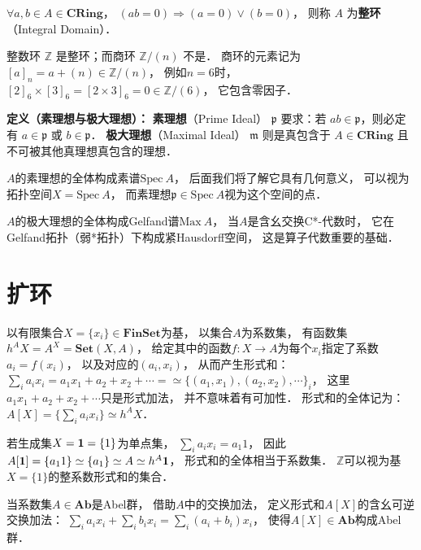 \begin{framed}
\noindent
$\forall a,b \in A \in \textbf{CRing}$，
$(ab=0) \Rightarrow (a=0) \vee (b=0)$，
则称 $A$ 为\textbf{整环}（Integral Domain）．
\end{framed}

整数环 $\mathbb{Z}$ 是整环；而商环 $\mathbb{Z}/(n)$ 不是．
商环的元素记为$[a]_n = a + (n) \in \mathbb{Z}/(n)$，
例如$n=6$时，
$[2]_6 \times [3]_6 = [2 \times 3]_6 = 0 \in \mathbb{Z}/(6)$，
它包含零因子．

\begin{framed}
\noindent\textbf{定义（素理想与极大理想）：}
\textbf{素理想}（Prime Ideal） $\mathfrak{p}$ 要求：若 $ab \in \mathfrak{p}$，则必定有 $a \in \mathfrak{p}$ 或 $b \in \mathfrak{p}$．
\textbf{极大理想}（Maximal Ideal） $\mathfrak{m}$ 则是真包含于 $A \in \textbf{CRing}$ 且不可被其他真理想真包含的理想．
\end{framed}

$A$的素理想的全体构成素谱$\text{Spec} \ A$，
后面我们将了解它具有几何意义，
可以视为拓扑空间$X = \text{Spec} \ A$，
而素理想$\mathfrak p\in \text{Spec} \ A$视为这个空间的点．

$A$的极大理想的全体构成Gelfand谱$\text{Max} \ A$，
当$A$是含幺交换C*-代数时，
它在Gelfand拓扑（弱*拓扑）下构成紧Hausdorff空间，
这是算子代数重要的基础．

\section{扩环}

以有限集合$X = \{x_i\} \in\textbf{FinSet}$为基，
以集合$A$为系数集，
有函数集$h^A X = A^X = \textbf{Set}(X,A)$，
给定其中的函数$f:X \to A$为每个$x_i$指定了系数$a_i = f(x_i)$，
以及对应的$(a_i,x_i)$，
从而产生形式和：
$\sum_i a_i x_i = a_1 x_1 + a_2 + x_2 + \cdots = \simeq \{ (a_1,x_1),(a_2,x_2), \cdots \}_i$，
这里$a_1 x_1 + a_2 + x_2 + \cdots$只是形式加法，
并不意味着有可加性．
形式和的全体记为：
$A[X] = \{ \sum_i a_i x_i \} \simeq h^A X$．

若生成集$X = \textbf 1 = \{1\}$为单点集，
$\sum_i a_i x_i = a_1 1$，
因此
$A[\textbf{1}] = \{ a_1 1 \} \simeq \{ a_1 \} \simeq A \simeq h^A \textbf 1$，
形式和的全体相当于系数集．
$\mathbb Z$可以视为基$X=\{1\}$的整系数形式和的集合．

当系数集$A \in \textbf{Ab}$是Abel群，
借助$A$中的交换加法，
定义形式和$A[X]$的含幺可逆交换加法：
$\sum_i a_i x_i + \sum_i b_i x_i = \sum_i (a_i + b_i) x_i$，
使得$A[X] \in \textbf{Ab}$构成Abel群．

